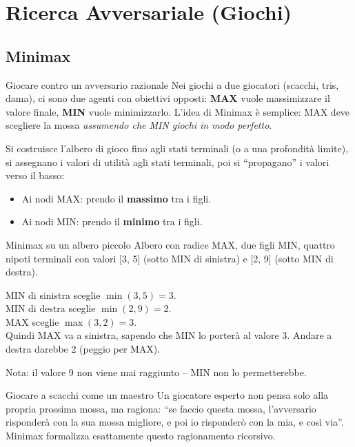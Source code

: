 \documentclass[12pt,a4paper]{article}
\begin{document}
\section{Ricerca Avversariale (Giochi)}

\subsection{Minimax}

\begin{narrativo}{Giocare contro un avversario razionale}
Nei giochi a due giocatori (scacchi, tris, dama), ci sono due agenti con obiettivi opposti: \textbf{MAX} vuole massimizzare il valore finale, \textbf{MIN} vuole minimizzarlo. L'idea di Minimax è semplice: MAX deve scegliere la mossa \emph{assumendo che MIN giochi in modo perfetto}.

Si costruisce l'albero di gioco fino agli stati terminali (o a una profondità limite), si assegnano i valori di utilità agli stati terminali, poi si ``propagano'' i valori verso il basso:
\begin{itemize}[noitemsep]
  \item Ai nodi MAX: prendo il \textbf{massimo} tra i figli.
  \item Ai nodi MIN: prendo il \textbf{minimo} tra i figli.
\end{itemize}
\end{narrativo}

\begin{esempio}{Minimax su un albero piccolo}
Albero con radice MAX, due figli MIN, quattro nipoti terminali con valori [3, 5] (sotto MIN di sinistra) e [2, 9] (sotto MIN di destra).

MIN di sinistra sceglie $\min(3,5) = 3$.\\
MIN di destra sceglie $\min(2,9) = 2$.\\
MAX sceglie $\max(3,2) = 3$.\\
Quindi MAX va a sinistra, sapendo che MIN lo porterà al valore 3. Andare a destra darebbe 2 (peggio per MAX).

Nota: il valore 9 non viene mai raggiunto -- MIN non lo permetterebbe.
\end{esempio}

\begin{analogia}{Giocare a scacchi come un maestro}
Un giocatore esperto non pensa solo alla propria prossima mossa, ma ragiona: ``se faccio questa mossa, l'avversario risponderà con la sua mossa migliore, e poi io risponderò con la mia, e così via''. Minimax formalizza esattamente questo ragionamento ricorsivo.
\end{analogia}
\end{document}
